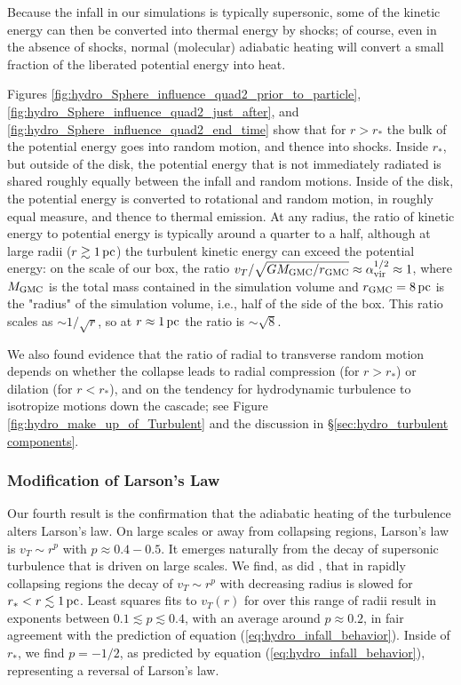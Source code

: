 \documentclass[../dissertation.tex]{subfiles}
\begin{document}
Because the infall in our simulations is typically supersonic, some of the kinetic energy can then 
be converted into thermal energy by shocks; of course, even in the absence 
of shocks, normal (molecular) adiabatic heating will convert a small fraction 
of the liberated potential energy into heat.

Figures \ref{fig:hydro_Sphere_influence_quad2_prior_to_particle},
\ref{fig:hydro_Sphere_influence_quad2_just_after}, and \ref{fig:hydro_Sphere_influence_quad2_end_time} 
show that for $r > r_*$ the bulk of the potential energy goes into random motion, 
and thence into shocks. Inside $r_*$, but outside of the disk, the potential energy 
that is not immediately radiated is shared roughly equally between the infall and 
random motions. Inside of the disk, the potential energy is converted to 
rotational and random motion, in roughly equal measure, and thence to thermal 
emission. At any radius, the ratio of kinetic energy to potential energy is
typically around a quarter to a half, although at large radii
($r\gtrsim 1\,\rm pc$) the turbulent kinetic energy can exceed the potential
energy: on the scale of our box, the ratio 
$v_T/\sqrt{GM_{\rm GMC}/r_{\rm GMC}}\approx \alpha^{1/2}_{\rm vir}\approx 1$,  
where $M_{\rm GMC}$ is the total mass contained in the simulation volume and 
$r_{\rm GMC} = 8\,\rm pc$ is the "radius" of the simulation volume, i.e., half of the side 
of the box.  This ratio scales as $\sim 1/\sqrt{r}$, so at 
$r\approx 1\,\rm pc$ the ratio is $\sim\sqrt{8}$.

We also found evidence that the ratio of radial to transverse
random motion depends on whether the collapse leads to radial
compression (for $r>r_*$) or dilation (for $r<r_*$), and on the
tendency for hydrodynamic turbulence to isotropize motions down the
cascade; see Figure \ref{fig:hydro_make_up_of_Turbulent} and the
discussion in \S \ref{sec:hydro_turbulent components}.

\subsubsection{Modification of Larson's Law}\label{sec:hydro_modification larson}
Our fourth result is the confirmation that the adiabatic heating of the turbulence 
alters Larson's law. On large scales or away from collapsing regions, Larson's 
law is $v_T\sim r^p$ with $p\approx 0.4-0.5$. It emerges naturally from the 
decay of supersonic turbulence that is driven on large scales.  We find, as did
\citet{2015ApJ...800...49L}, that in rapidly collapsing regions the decay of 
$v_T\sim r^p$ with decreasing radius is slowed for $r_*<r\lesssim 1\,\rm pc$. 
Least squares fits to $v_T(r)$ for over this range of radii result in 
exponents between $0.1\lesssim p\lesssim 0.4$, with an average around 
$p\approx 0.2$, in fair agreement with the prediction of equation (\ref{eq:hydro_infall_behavior}). Inside of $r_*$, we find $p=-1/2$, as predicted by equation (\ref{eq:hydro_infall_behavior}), representing a reversal of Larson's law. 
\end{document}
